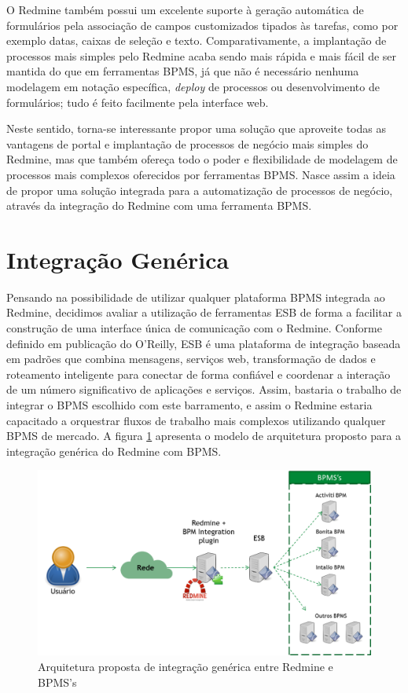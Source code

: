 O Redmine também possui um excelente suporte à geração automática de formulários pela associação de campos customizados tipados às tarefas, como por exemplo datas, caixas de seleção e texto. Comparativamente, a implantação de processos mais simples pelo Redmine acaba sendo mais rápida e mais fácil de ser mantida do que em ferramentas BPMS, já que não é necessário nenhuma modelagem em notação específica, \textit{deploy} de processos ou desenvolvimento de formulários; tudo é feito facilmente pela interface web. 

Neste sentido, torna-se interessante propor uma solução que aproveite todas as vantagens de portal e implantação de processos de negócio mais simples do Redmine, mas que também ofereça todo o poder e flexibilidade de modelagem de processos mais complexos oferecidos por ferramentas BPMS. Nasce assim a ideia de propor uma solução integrada para a automatização de processos de negócio, através da integração do Redmine com uma ferramenta BPMS.

\section{Integração Genérica}\label{sec:cenario-integracao-genérica}

 
 Pensando na possibilidade de utilizar qualquer plataforma BPMS integrada ao Redmine, decidimos avaliar a utilização de ferramentas ESB\cite{esb} de forma a facilitar a construção de uma interface única de comunicação com o Redmine. Conforme definido em publicação do O'Reilly\cite{oreilly_esb}, ESB é uma plataforma de integração baseada em padrões que combina mensagens, serviços web, transformação de dados e roteamento inteligente para conectar de forma confiável e coordenar a interação de um número significativo de aplicações e serviços. Assim, bastaria o trabalho de integrar o BPMS escolhido com este barramento, e assim o Redmine estaria capacitado a orquestrar fluxos de trabalho mais complexos utilizando qualquer BPMS de mercado. A figura \ref{fig:arquitetura_integracao_generica_redmine_bpm}  apresenta o modelo de arquitetura proposto para a integração genérica do Redmine com BPMS.

\begin{figure}[H]
\centering
\includegraphics[width=1\textwidth]{imagens/arquitetura_proposta_inicialmente_bpm_integration.png}
\caption{Arquitetura proposta de integração genérica entre Redmine e BPMS's}
\label{fig:arquitetura_integracao_generica_redmine_bpm}
\end{figure}

